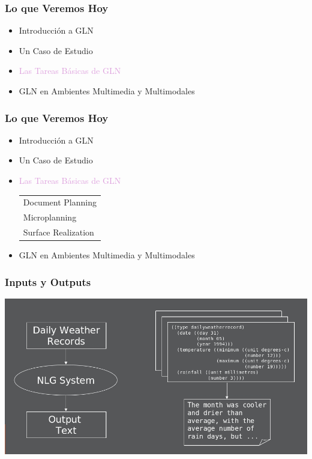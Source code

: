 \documentclass[compress,color=usenames]{beamer}
\newcommand{\mH}[1]{\textcolor{Plum}{#1}}
\begin{document}
\begin{frame}
\frametitle{Lo que Veremos Hoy}

\begin{itemize}
\item  Introducci\'on a GLN 
\item  Un Caso de Estudio
\item  \mH{Las Tareas B\'asicas de GLN}
\item  GLN en Ambientes Multimedia y Multimodales
\end{itemize}
\end{frame}

\begin{frame}
\frametitle{Lo que Veremos Hoy}

\begin{itemize}
\item  Introducci\'on a GLN 
\item  Un Caso de Estudio
\item  \mH{Las Tareas B\'asicas de GLN}
\begin{tabular}{|l}
Document Planning\\
Microplanning\\
Surface Realization
\end{tabular}
\item  GLN en Ambientes Multimedia y Multimodales
\end{itemize}
\end{frame}

\begin{frame}
\frametitle{Inputs y Outputs}

\begin{center}
\includegraphics[scale=.4]{pics/pic6.jpg}
\end{center}

\end{frame}
\end{document}
